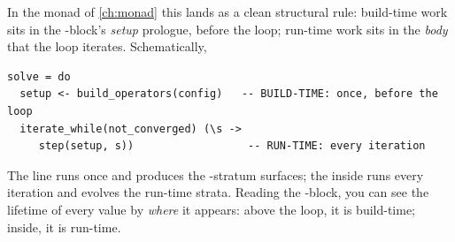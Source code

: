 In the monad of \cref{ch:monad} this lands as a clean structural rule:
build-time work sits in the -block's \emph{setup} prologue, before the
loop; run-time work sits in the \emph{body} that the loop iterates. Schematically,

\begin{lstlisting}[style=l4style]
solve = do
  setup <- build_operators(config)   -- BUILD-TIME: once, before the loop
  iterate_while(not_converged) (\s ->
     step(setup, s))                  -- RUN-TIME: every iteration
\end{lstlisting}

The  line runs once and produces the -stratum
surfaces; the  inside  runs every iteration and
evolves the run-time strata. Reading the -block, you can see the
lifetime of every value by \emph{where} it appears: above the loop, it is
build-time; inside, it is run-time.

